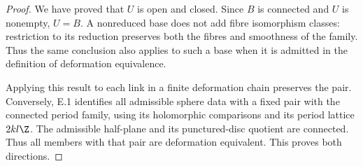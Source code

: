 \begin{proof}
We have proved that $U$ is open
and closed.  Since $B$ is
connected and $U$ is nonempty,
$U=B$.  A nonreduced base
does not add fibre isomorphism
classes: restriction to its
reduction preserves both the
fibres and smoothness of the
family.  Thus the same conclusion
also applies to such a base
when it is admitted in the
definition of deformation
equivalence.

Applying this result to each
link in a finite deformation
chain preserves the pair.
Conversely, E.1 identifies
all admissible sphere data
with a fixed pair with the
connected period family,
using its holomorphic
comparisons and its period
lattice $2kl\Z$.
The admissible half-plane
and its punctured-disc
quotient are connected.
Thus all members with
that pair are deformation
equivalent.  This proves
both directions.
\end{proof}

